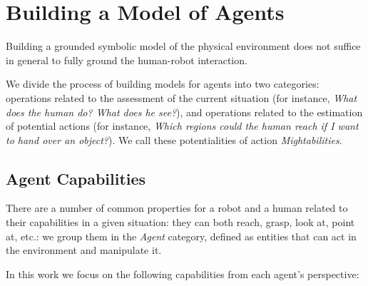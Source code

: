 \documentclass{svmult}
\begin{document}

\section{Building a Model of Agents}
\label{grounding_agents}

Building a grounded symbolic model of the physical environment does not suffice
in general to fully ground the human-robot interaction.

We divide the process of building models for agents into two categories:
operations related to the assessment of the current situation (for instance,
\emph{What does the human do? What does he see?}), and operations related to
the estimation of potential actions (for instance, \emph{Which regions could
the human reach if I want to hand over an object?}). We call these
potentialities of action \emph{Mightabilities}.

\subsection{Agent Capabilities}

There are a number of common properties for a robot and a human related to
their capabilities in a given situation: they can both reach, grasp, look at,
point at, etc.: we group them in the \emph{Agent} category, defined as entities
that can act in the environment and manipulate it.

In this work we focus on the following capabilities from each agent's
perspective:
\end{document}
